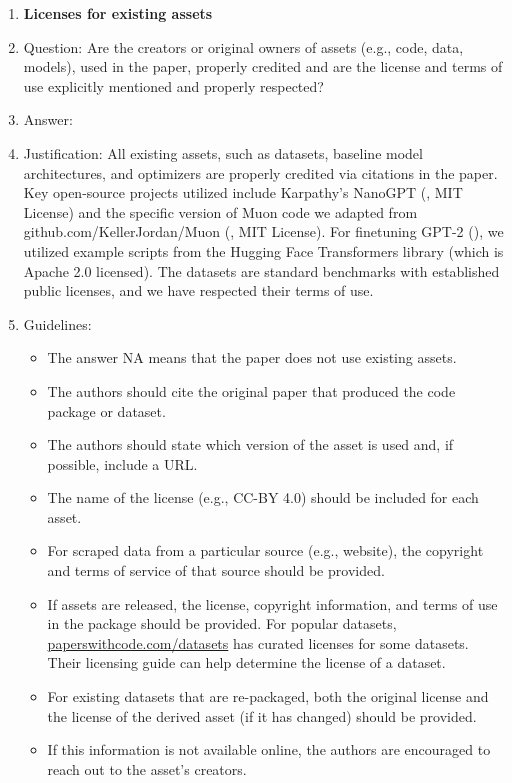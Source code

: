 \documentclass{article}
\theoremstyle{remark}
\begin{document}
\begin{enumerate}
\item {\bf Licenses for existing assets}
    \item[] Question: Are the creators or original owners of assets (e.g., code, data, models), used in the paper, properly credited and are the license and terms of use explicitly mentioned and properly respected?
    \item[] Answer: \answerYes{} %
    \item[] Justification: All existing assets, such as datasets, baseline model architectures, and optimizers are properly credited via citations in the paper. Key open-source projects utilized include Karpathy's NanoGPT (\cite{Karpathy2022}, MIT License) and the specific version of Muon code we adapted from github.com/KellerJordan/Muon (\cite{jordan2024muon}, MIT License). For finetuning GPT-2 (\cite{radford2019language}), we utilized example scripts from the Hugging Face Transformers library (which is Apache 2.0 licensed). The datasets are standard benchmarks with established public licenses, and we have respected their terms of use.
    \item[] Guidelines:
    \begin{itemize}
        \item The answer NA means that the paper does not use existing assets.
        \item The authors should cite the original paper that produced the code package or dataset.
        \item The authors should state which version of the asset is used and, if possible, include a URL.
        \item The name of the license (e.g., CC-BY 4.0) should be included for each asset.
        \item For scraped data from a particular source (e.g., website), the copyright and terms of service of that source should be provided.
        \item If assets are released, the license, copyright information, and terms of use in the package should be provided. For popular datasets, \url{paperswithcode.com/datasets} has curated licenses for some datasets. Their licensing guide can help determine the license of a dataset.
        \item For existing datasets that are re-packaged, both the original license and the license of the derived asset (if it has changed) should be provided.
        \item If this information is not available online, the authors are encouraged to reach out to the asset's creators.
    \end{itemize}


\end{enumerate}
\end{document}
